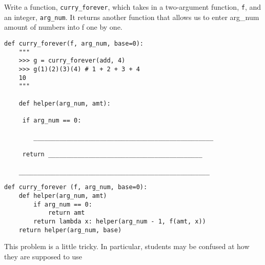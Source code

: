 \begin{blocksection}
\question Write a function, \texttt{curry\_forever}, which takes in a two-argument function, \texttt{f}, and an integer, \texttt{arg\_num}. It returns another function that allows us to enter arg\_num amount of numbers into f one by one.

\begin{lstlisting}
def curry_forever(f, arg_num, base=0):
    """
    >>> g = curry_forever(add, 4)
    >>> g(1)(2)(3)(4) # 1 + 2 + 3 + 4
    10 
    """

    def helper(arg_num, amt):
    
   	 if arg_num == 0:
   	 
   	    _________________________________________________
   	    
   	 return __________________________________________
   	 
    ____________________________________________________

\end{lstlisting}

\begin{solution}
\begin{lstlisting}
def curry_forever (f, arg_num, base=0):
    def helper(arg_num, amt)
   	    if arg_num == 0:
   		    return amt
   	    return lambda x: helper(arg_num - 1, f(amt, x))
    return helper(arg_num, base)

\end{lstlisting}
\end{solution}

\begin{questionmeta}
This problem is a little tricky. In particular, students may be confused at how they are supposed to use 
\end{questionmeta}
\end{blocksection}

